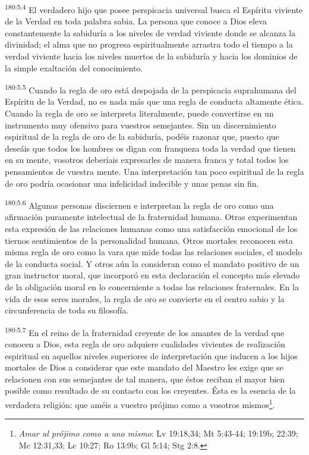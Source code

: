 \par
\textsuperscript{180:5.4} El verdadero hijo que posee perspicacia universal busca el Espíritu viviente de la Verdad en toda palabra sabia. La persona que conoce a Dios eleva constantemente la sabiduría a los niveles de verdad viviente donde se alcanza la divinidad; el alma que no progresa espiritualmente arrastra todo el tiempo a la verdad viviente hacia los niveles muertos de la sabiduría y hacia los dominios de la simple exaltación del conocimiento.

\par
\textsuperscript{180:5.5} Cuando la regla de oro está despojada de la perspicacia suprahumana del Espíritu de la Verdad, no es nada más que una regla de conducta altamente ética. Cuando la regla de oro se interpreta literalmente, puede convertirse en un instrumento muy ofensivo para vuestros semejantes. Sin un discernimiento espiritual de la regla de oro de la sabiduría, podéis razonar que, puesto que deseáis que todos los hombres os digan con franqueza toda la verdad que tienen en su mente, vosotros deberíais expresarles de manera franca y total todos los pensamientos de vuestra mente. Una interpretación tan poco espiritual de la regla de oro podría ocasionar una infelicidad indecible y unas penas sin fin.

\par
\textsuperscript{180:5.6} Algunas personas disciernen e interpretan la regla de oro como una afirmación puramente intelectual de la fraternidad humana. Otras experimentan esta expresión de las relaciones humanas como una satisfacción emocional de los tiernos sentimientos de la personalidad humana. Otros mortales reconocen esta misma regla de oro como la vara que mide todas las relaciones sociales, el modelo de la conducta social. Y otros aún la consideran como el mandato positivo de un gran instructor moral, que incorporó en esta declaración el concepto más elevado de la obligación moral en lo concerniente a todas las relaciones fraternales. En la vida de esos seres morales, la regla de oro se convierte en el centro sabio y la circunferencia de toda su filosofía.

\par
\textsuperscript{180:5.7} En el reino de la fraternidad creyente de los amantes de la verdad que conocen a Dios, esta regla de oro adquiere cualidades vivientes de realización espiritual en aquellos niveles superiores de interpretación que inducen a los hijos mortales de Dios a considerar que este mandato del Maestro les exige que se relacionen con sus semejantes de tal manera, que éstos reciban el mayor bien posible como resultado de su contacto con los creyentes. Ésta es la esencia de la verdadera religión: que améis a vuestro prójimo como a vosotros mismos\footnote{\textit{Amar al prójimo como a uno mismo}: Lv 19:18,34; Mt 5:43-44; 19:19b; 22:39; Mc 12:31,33; Lc 10:27; Ro 13:9b; Gl 5:14; Stg 2:8.}.

